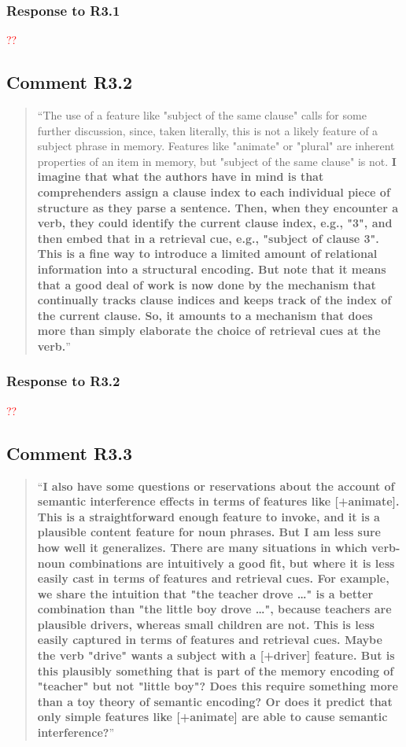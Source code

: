 \documentclass[12pt]{article}
\begin{document}
\subsubsection*{Response to R3.1}
\textcolor{red}{??}

\subsection*{Comment R3.2}
\begin{quote}
``The use of a feature like "subject of the same clause" calls for some further discussion, since, taken literally, this is not a likely feature of a subject phrase in memory. Features like "animate" or "plural" are inherent properties of an item in memory, but "subject of the same clause" is not. \textbf{I imagine that what the authors have in mind is that comprehenders assign a clause index to each individual piece of structure as they parse a sentence. Then, when they encounter a verb, they could identify the current clause index, e.g., "3", and then embed that in a retrieval cue, e.g., "subject of clause 3". This is a fine way to introduce a limited amount of relational information into a structural encoding. But note that it means that a good deal of work is now done by the mechanism that continually tracks clause indices and keeps track of the index of the current clause. So, it amounts to a mechanism that does more than simply elaborate the choice of retrieval cues at the verb.}''
\end{quote}

\subsubsection*{Response to R3.2}
\textcolor{red}{??}

\subsection*{Comment R3.3}
\begin{quote}
``\textbf{I also have some questions or reservations about the account of semantic interference effects in terms of features like [+animate]. This is a straightforward enough feature to invoke, and it is a plausible content feature for noun phrases. But I am less sure how well it generalizes. There are many situations in which verb-noun combinations are intuitively a good fit, but where it is less easily cast in terms of features and retrieval cues. For example, we share the intuition that "the teacher drove …" is a better combination than "the little boy drove …", because teachers are plausible drivers, whereas small children are not. This is less easily captured in terms of features and retrieval cues. Maybe the verb "drive" wants a subject with a [+driver] feature. But is this plausibly something that is part of the memory encoding of "teacher" but not "little boy"? Does this require something more than a toy theory of semantic encoding? Or does it predict that only simple features like [+animate] are able to cause semantic interference?}''
\end{quote}
\end{document}
